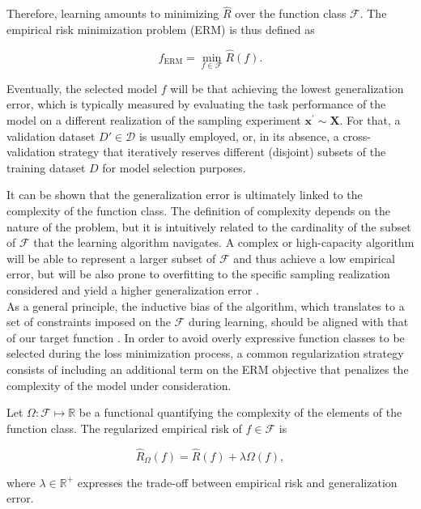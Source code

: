 Therefore, learning amounts to minimizing $\hat{R}$ over the function class $\mathcal{F}$. The
empirical risk minimization problem (ERM) is thus defined as

$$
f_{\operatorname{ERM}} = \min_{f \in \mathcal{F}} \hat{R}(f).
$$

Eventually, the selected model $f$ will be that achieving the lowest
generalization error, which is typically measured by evaluating 
the task performance of the model on a different realization of the 
sampling experiment $\bm{x^\prime} \sim \bm{X}$. For that, a 
validation dataset $D' \in \mathcal{D}$ is usually employed, or, 
in its absence, a cross-validation strategy that iteratively reserves 
different (disjoint) subsets of the training dataset $D$ for model selection purposes.


It can be shown that the generalization 
error is ultimately linked to the complexity of the function class. 
The definition of complexity depends on the nature of the problem, but it is
intuitively related to the cardinality of the subset of $\mathcal{F}$ that the 
learning algorithm navigates. A complex or 
high-capacity algorithm will be able to represent a larger subset 
of $\mathcal{F}$ and thus achieve a low empirical error, but will be also
prone to overfitting to the specific sampling realization considered and yield
a higher generalization error \cite{n.vapnikNatureStatisticalLearning2000}. \\

As a general principle, the inductive bias of the algorithm, which translates to a set 
of constraints imposed on the $\mathcal{F}$ during learning, should be aligned with
that of our target function \cite{jimenezInductiveBiasDeep}. In order to avoid overly
expressive function classes to be selected during the loss minimization process, 
a common regularization strategy consists of including an additional term on the ERM objective 
that penalizes the complexity of the model under consideration.

\begin{definition}\label{def:rrm}
    Let $\Omega: \mathcal{F} \longmapsto \mathbb{R}$ be a functional quantifying the complexity
    of the elements of the function class. The regularized empirical risk of $f \in \mathcal{F}$
    is

    $$
    \hat{R}_{\Omega}(f)=\hat{R}(f) + \lambda \Omega(f),
    $$

    where $\lambda \in \mathbb{R}^+$ expresses the trade-off between empirical risk and generalization error.

\end{definition}



